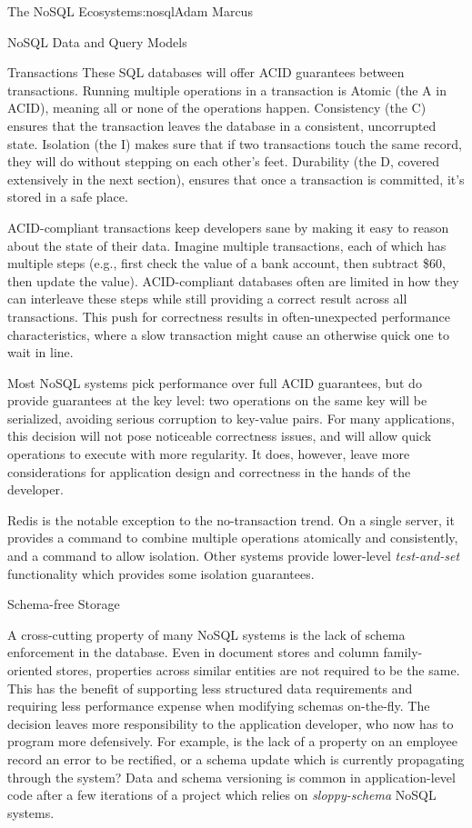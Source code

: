 \begin{aosachapter}{The NoSQL Ecosystem}{s:nosql}{Adam Marcus}
\begin{aosasect1}{NoSQL Data and Query Models}
\begin{aosasect2}{Transactions}
These SQL databases will offer ACID guarantees between transactions.
Running multiple operations in a transaction is Atomic (the A in
ACID), meaning all or none of the operations happen.  Consistency (the
C) ensures that the transaction leaves the database in a consistent,
uncorrupted state.  Isolation (the I) makes sure that if two
transactions touch the same record, they will do without stepping on
each other's feet.  Durability (the D, covered extensively in the next
section), ensures that once a transaction is committed, it's stored in
a safe place.

ACID-compliant transactions keep developers sane by making it easy to
reason about the state of their data.  Imagine multiple
transactions, each of which has multiple steps (e.g., first check the
value of a bank account, then subtract \$60, then update the
value). ACID-compliant databases often are limited in how they can
interleave these steps while still providing a correct result across
all transactions.  This push for correctness results in
often-unexpected performance characteristics, where a slow transaction
might cause an otherwise quick one to wait in line.

Most NoSQL systems pick performance over full ACID guarantees, but do
provide guarantees at the key level: two operations on the same key
will be serialized, avoiding serious corruption to key-value pairs.
For many applications, this decision will not pose noticeable
correctness issues, and will allow quick operations to execute with
more regularity.  It does, however, leave more considerations for
application design and correctness in the hands of the developer.

Redis is the notable exception to the no-transaction trend.  On a
single server, it provides a  command to combine multiple
operations atomically and consistently, and a  command to
allow isolation.  Other systems provide lower-level
\emph{test-and-set} functionality which provides some isolation
guarantees.

\end{aosasect2}

\begin{aosasect2}{Schema-free Storage }

A cross-cutting property of many NoSQL systems is the lack of schema
enforcement in the database.  Even in document stores and column
family-oriented stores, properties across similar entities are not
required to be the same.  This has the benefit of supporting less
structured data requirements and requiring less performance expense
when modifying schemas on-the-fly.  The decision leaves more
responsibility to the application developer, who now has to program
more defensively.  For example, is the lack of a 
property on an employee record an error to be rectified, or a schema
update which is currently propagating through the system?  Data and
schema versioning is common in application-level code after a few
iterations of a project which relies on \emph{sloppy-schema} NoSQL
systems.


\end{aosasect2}
\end{aosasect1}
\end{aosachapter}
